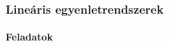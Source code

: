 \documentclass[xcolor={table}]{beamer}
\begin{document}
\begin{frame}
  \frametitle{Lineáris egyenletrendszerek}
  \framesubtitle{Feladatok}

  
\end{frame}

%
%
%
\end{document}
